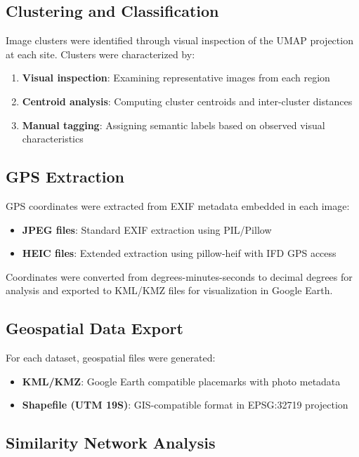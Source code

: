 \subsection{Clustering and Classification}

Image clusters were identified through visual inspection of the UMAP projection at each site. Clusters were characterized by:

\begin{enumerate}
    \item \textbf{Visual inspection}: Examining representative images from each region
    \item \textbf{Centroid analysis}: Computing cluster centroids and inter-cluster distances
    \item \textbf{Manual tagging}: Assigning semantic labels based on observed visual characteristics
\end{enumerate}

\subsection{GPS Extraction}

GPS coordinates were extracted from EXIF metadata embedded in each image:

\begin{itemize}
    \item \textbf{JPEG files}: Standard EXIF extraction using PIL/Pillow
    \item \textbf{HEIC files}: Extended extraction using pillow-heif with IFD GPS access
\end{itemize}

Coordinates were converted from degrees-minutes-seconds to decimal degrees for analysis and exported to KML/KMZ files for visualization in Google Earth.

\subsection{Geospatial Data Export}

For each dataset, geospatial files were generated:
\begin{itemize}
    \item \textbf{KML/KMZ}: Google Earth compatible placemarks with photo metadata
    \item \textbf{Shapefile (UTM 19S)}: GIS-compatible format in EPSG:32719 projection
\end{itemize}

\subsection{Similarity Network Analysis}

